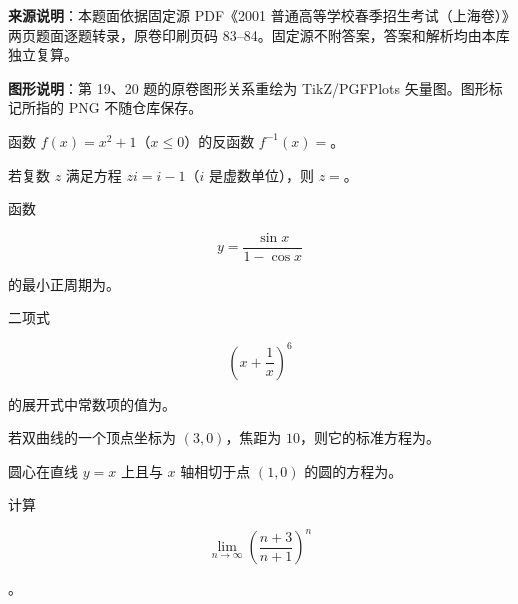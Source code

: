 


\begin{gktip}
\textbf{来源说明}：本题面依据固定源 PDF《2001 普通高等学校春季招生考试（上海卷）》两页题面逐题转录，原卷印刷页码 83–84。固定源不附答案，答案和解析均由本库独立复算。

\textbf{图形说明}：第 19、20 题的原卷图形关系重绘为 TikZ/PGFPlots 矢量图。图形标记所指的 PNG 不随仓库保存。
\end{gktip}


\begin{question}
函数 $f(x)=x^2+1$（$x\le0$）的反函数 $f^{-1}(x)=$\gkblank{}。

\end{question}
\begin{question}
若复数 $z$ 满足方程 $zi=i-1$（$i$ 是虚数单位），则 $z=$\gkblank{}。

\end{question}
\begin{question}
函数

\nopagebreak[4]
\[
y=\dfrac{\sin x}{1-\cos x}
\]

的最小正周期为\gkblank{}。

\end{question}
\begin{question}
二项式

\nopagebreak[4]
\[
\left(x+\dfrac1x\right)^6
\]

的展开式中常数项的值为\gkblank{}。

\end{question}
\begin{question}
若双曲线的一个顶点坐标为 $(3,0)$，焦距为 $10$，则它的标准方程为\gkblank{}。

\end{question}
\begin{question}
圆心在直线 $y=x$ 上且与 $x$ 轴相切于点 $(1,0)$ 的圆的方程为\gkblank{}。

\end{question}
\begin{question}
计算

\nopagebreak[4]
\[
\lim_{n\to\infty}\left(\dfrac{n+3}{n+1}\right)^n
\]

。

\end{question}
